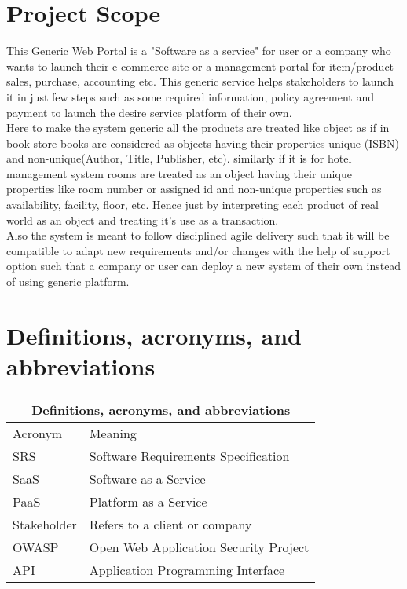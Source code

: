 \documentclass{scrreprt}
\begin{document}
\section{Project Scope}
\label{scope}
This Generic Web Portal is a "Software as a service" for user or a company who wants to launch their e-commerce site or a management portal for item/product sales, purchase, accounting etc. This generic service helps stakeholders to launch it in just few steps such as some required information, policy agreement and payment to launch the desire service platform of their own. \\
Here to make the system generic all the products are treated like object as if in book store books are considered as  objects having their properties unique (ISBN) and non-unique(Author, Title, Publisher, etc). similarly if it is for hotel management system rooms are treated as an object having their unique properties like room number or assigned id and non-unique properties such as availability, facility, floor, etc. Hence just by interpreting each product of real world as an object and treating it's use as a transaction.
\\
Also the system is meant to follow disciplined agile delivery such that it will be compatible to adapt new requirements and/or changes with the help of support option such that a company or user can deploy a new system of their own instead of using generic platform.

\section{Definitions, acronyms, and abbreviations}
\label{acronyms}
\begin{center}
\begin{tabular}{ |p{3cm}||p{9cm}|  }
	\hline
	\multicolumn{2}{|c|}{Definitions, acronyms, and abbreviations} \\
	\hline
	Acronym		&	Meaning	\\
	\hline
	SRS			&   Software Requirements Specification	\\
	SaaS		&   Software as a Service	\\
	PaaS		&	Platform as a Service	\\
	Stakeholder	&	Refers to a client or company	\\
	OWASP		&	Open Web Application Security Project	\\
	API			&	Application Programming Interface	\\

	\hline
\end{tabular}
\end{center}
\end{document}
